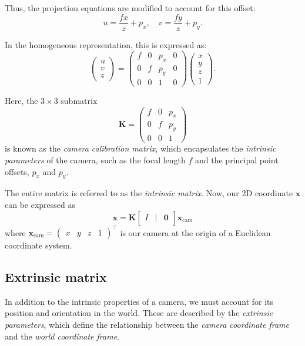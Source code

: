 \documentclass[12pt]{article}
\begin{document}
Thus, the projection equations are modified to account for this offset:
$$
u = \frac{f x}{z} + p_x, \quad v = \frac{f y}{z} + p_y.
$$

In the homogeneous representation, this is expressed as:
$$
\begin{pmatrix} u \\ v \\ z \end{pmatrix} = 
\begin{pmatrix}
f & 0 & p_x & 0 \\
0 & f & p_y & 0 \\
0 & 0 & 1 & 0
\end{pmatrix}
\begin{pmatrix} x \\ y \\ z \\ 1 \end{pmatrix}.
$$

Here, the $3 \times 3$ submatrix
$$
\mathbf{K} = \begin{pmatrix}
f & 0 & p_x \\
0 & f & p_y \\
0 & 0 & 1
\end{pmatrix}
$$
is known as the \textit{camera calibration matrix}, which encapsulates the \textit{intrinsic parameters} of the camera, such as the focal length $f$ and the principal point offsets, $p_x$ and $p_y$.

The entire matrix is referred to as the \textit{intrinsic matrix}. Now, our 2D coordinate  $\mathbf{x}$ can be expressed as
$$
\mathbf{x} = \mathbf{K}\begin{bmatrix}
    I & | & \mathbf{0}
\end{bmatrix}\mathbf{x}_\text{cam}
$$
where $\mathbf{x}_\text{cam}=\begin{pmatrix}
    x & y & z & 1
\end{pmatrix}^\top$ is our camera at the origin of a Euclidean coordinate system.

\subsection{Extrinsic matrix}

In addition to the intrinsic properties of a camera, we must account for its position and orientation in the world. These are described by the \textit{extrinsic parameters}, which define the relationship between the \textit{camera coordinate frame} and the \textit{world coordinate frame}. 
\end{document}
